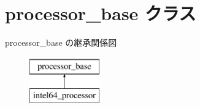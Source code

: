 \hypertarget{classprocessor__base}{}\section{processor\+\_\+base クラス}
\label{classprocessor__base}
processor\+\_\+base の継承関係図\begin{figure}[H]
\begin{center}
\leavevmode
\includegraphics[height=2.000000cm]{classprocessor__base}
\end{center}
\end{figure}
